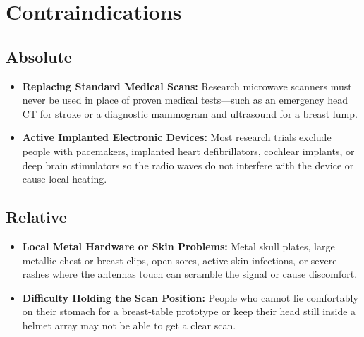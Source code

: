 \section{Contraindications}

\subsection{Absolute}
\begin{itemize}
  \item \textbf{Replacing Standard Medical Scans:} Research microwave scanners must never be used in place of proven medical tests---such as an emergency head CT for stroke or a diagnostic mammogram and ultrasound for a breast lump.
  \item \textbf{Active Implanted Electronic Devices:} Most research trials exclude people with pacemakers, implanted heart defibrillators, cochlear implants, or deep brain stimulators so the radio waves do not interfere with the device or cause local heating.
\end{itemize}

\subsection{Relative}
\begin{itemize}
  \item \textbf{Local Metal Hardware or Skin Problems:} Metal skull plates, large metallic chest or breast clips, open sores, active skin infections, or severe rashes where the antennas touch can scramble the signal or cause discomfort.
  \item \textbf{Difficulty Holding the Scan Position:} People who cannot lie comfortably on their stomach for a breast-table prototype or keep their head still inside a helmet array may not be able to get a clear scan.
\end{itemize}

